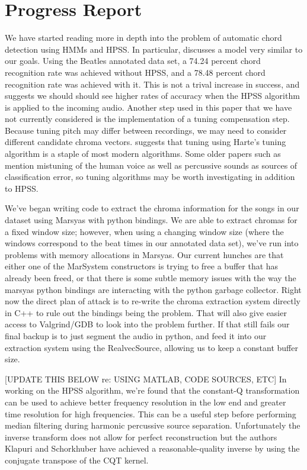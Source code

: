 \documentclass{article}
\begin{document}
\section{Progress Report}\label{sec:progreport}

We have started reading more in depth into the problem of automatic chord
detection using HMMs and HPSS. In particular, \cite{Ueda:19} discusses a model
very similar to our goals.  Using the Beatles annotated data set, a 74.24
percent chord recognition rate was achieved without HPSS, and a 78.48 percent
chord recognition rate was achieved with it. This is not a trival increase in
success, and suggests we should should see higher rates of accuracy when the
HPSS algorithm is applied to the incoming audio. Another step used in this
paper that we have not currently considered is the implementation of a tuning
compensation step. Because tuning pitch may differ between recordings, we may
need to consider different candidate chroma vectors.  \cite{McVicar:00}
suggests that tuning using Harte's tuning algorithm is a staple of most modern
algorithms.  Some older papers such as \cite{Zenz:20} mention mistuning of the
human voice as well as percussive sounds as sources of classification error, so
tuning algorithms may be worth investigating in addition to HPSS.

We've began writing code to extract the chroma information for the songs in our
dataset using Marsyas with python bindings. We are able to extract chromas for
a fixed window size; however, when using a changing window size (where the
windows correspond to the beat times in our annotated data set), we've run into
problems with memory allocations in Marsyas. Our current hunches are that
either one of the MarSystem constructors is trying to free a buffer that has
already been freed, or that there is some subtle memory issues with the way the
marsyas python bindings are interacting with the python garbage collector.
Right now the direct plan of attack is to re-write the chroma extraction system
directly in C++ to rule out the bindings being the problem. That will also give
easier access to Valgrind/GDB to look into the problem further.  If that still
fails our final backup is to just segment the audio in python, and feed it into
our extraction system using the RealvecSource, allowing us to keep a constant
buffer size.

[UPDATE THIS BELOW re: USING MATLAB, CODE SOURCES, ETC]
In working on the HPSS algorithm, we're found that the constant-Q
transformation can be used to achieve better frequency resolution in the low
end and greater time resolution for high frequencies. This can be a useful step
before performing median filtering during harmonic percussive source
separation.  Unfortunately the inverse transform does not allow for perfect
reconstruction but the authors Klapuri and Schorkhuber \cite{Schorkhuber:21}
have achieved a reasonable-quality inverse by using the conjugate transpose of
the CQT kernel.
\end{document}
